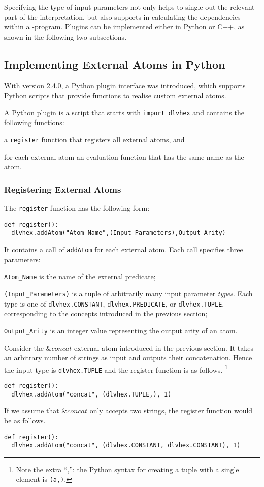 \documentclass[a4paper, titlepage]{article}
\newcommand{\amp}[1]{\ensuremath{\&{\mathit{#1}}}}
\begin{document}
Specifying the type of input parameters not only helps to 
single out the relevant part of the interpretation, but 
also supports \dlvhex{} in calculating the dependencies 
within a \hex-program. Plugins can be implemented either in Python or C++, as shown in the following two subsections.

\subsection{Implementing External Atoms in Python}
With \dlvhex{} version 2.4.0, a Python plugin interface was 
introduced, which supports Python scripts that provide 
functions to realise custom external atoms.

A Python plugin is a script that starts with
\verb|import dlvhex| and contains the following functions:
\begin{compactitem}
\item
  a \verb|register| function
  that registers all external atoms, and
\item
  for each external atom an evaluation function
  that has the same name as the atom.
\end{compactitem}

\subsubsection{Registering External Atoms}
\label{registerExtAtom}
%
The \verb+register+ function has the following form:
%
\begin{lstlisting} 
def register():
  dlvhex.addAtom("Atom_Name",(Input_Parameters),Output_Arity) 
\end{lstlisting}
%
It contains a call of \verb+addAtom+ for each external atom.
Each call specifies three parameters:
%
\begin{compactitem}
\item
  \verb+Atom_Name+ is the name of the external predicate;
\item
  \verb+(Input_Parameters)+ is a tuple of
  arbitrarily many input parameter \emph{types}.
  Each type is one of \verb+dlvhex.CONSTANT+, \verb+dlvhex.PREDICATE+, or 
  \verb+dlvhex.TUPLE+,
  corresponding to the concepts introduced in the previous section;
\item
  \verb+Output_Arity+ is an integer value
  representing the output arity of an atom.
\end{compactitem}
%
Consider the $\mathit{\&concat}$ external atom
introduced in the previous section.
It takes an arbitrary number of strings as input
and outputs their concatenation.
Hence the input type is \verb|dlvhex.TUPLE|
and the register function is as follows.%
\footnote{Note the extra ``,'': the Python syntax for creating a tuple
with a single element is \texttt{(a,)}.}
\begin{lstlisting}
def register():
  dlvhex.addAtom("concat", (dlvhex.TUPLE,), 1)  
\end{lstlisting}
If we assume that $\amp{concat}$ only accepts two strings,
the register function would be as follows.
\begin{lstlisting}
def register():
  dlvhex.addAtom("concat", (dlvhex.CONSTANT, dlvhex.CONSTANT), 1)  
\end{lstlisting}
\end{document}
